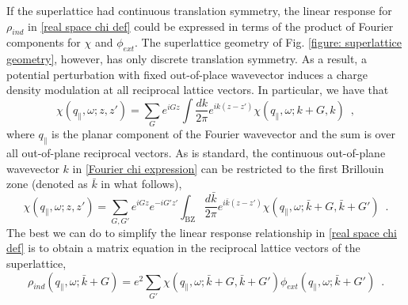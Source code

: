 If the superlattice had continuous translation symmetry, the linear response for $\rho_{ind}$ in \eqref{real space chi def} could be expressed in terms of the product of Fourier components for $\chi$ and $\phi_{ext}$.  The superlattice geometry of Fig. \ref{figure: superlattice geometry}, however, has only discrete translation symmetry.  As a result, a potential perturbation with fixed out-of-place wavevector induces a charge density modulation at all reciprocal lattice vectors.  In particular, we have that
\begin{equation}
    \label{Fourier chi expression}
    \chi(q_\parallel,\omega;z,z') = \sum_G e^{iG z} \int \frac{dk}{2\pi} e^{ik(z-z')}\chi(q_\parallel,\omega;k+G,k)
    \,\,\,,
\end{equation}
where $q_\parallel$ is the planar component of the Fourier wavevector and the sum is over all out-of-plane reciprocal vectors.  As is standard, the continuous out-of-plane wavevector $k$ in \eqref{Fourier chi expression} can be restricted to the first Brillouin zone (denoted as $\bar k$ in what follows),
\begin{equation}
    \label{Fourier chi G matrix}
    \chi(q_\parallel,\omega;z,z') = \sum_{G,G'} e^{iG z} e^{-i G' z'} \int_\text{BZ} \frac{d\bar k}{2\pi} e^{i\bar k(z-z')}\chi(q_\parallel,\omega;\bar k+G,\bar k+G')
    \,\,\,.
\end{equation}
The best we can do to simplify the linear response relationship in \eqref{real space chi def} is to obtain a matrix equation in the reciprocal lattice vectors of the superlattice,
\begin{equation}
    \label{planar linear response}
     \rho_{ind}(q_\parallel,\omega;\bar k+G) = e^2\sum_{G'}\chi(q_\parallel,\omega;\bar k+G, \bar k+G')
     \phi_{ext}(q_\parallel,\omega;\bar k+G')
     \,\,\,.
\end{equation}


